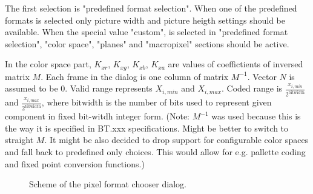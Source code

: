 The first selection is "predefined format selection". When one of the predefined formats is selected only picture width and picture heigth settings should be available. When the special value "custom", is selected in "predefined format selection", "color space", "planes" and "macropixel" sections should be active.

In the color space part, $K_{xr}$, $K_{xg}$, $K_{xb}$, $K_{xa}$ are values of coeffictients of inversed matrix $M$. Each frame in the dialog is one column of matrix $M^{-1}$. Vector $N$ is assumed to be 0. Valid range represents $X_{i, min}$ and $X_{i, max}$. Coded range is $\frac{x_{i, min}}{2 ^ \mathrm{bitwidth}}$ and $\frac{x_{i, max}}{2 ^ \mathrm{bitwidth}}$, where $\mathrm{bitwidth}$ is the number of bits used to represent given component in fixed bit-witdh integer form. (Note: $M^{-1}$ was used because this is the way it is specified in BT.xxx specifications. Might be better to switch to straight $M$. It might be also decided to drop support for configurable color spaces and fall back to predefined only choices. This would allow for e.g. pallette coding and fixed point conversion functions.)

\begin{figure}[ht]
  \begin{center}
    \def\svgwidth{400pt}
    
    \caption{Scheme of the pixel format chooser dialog.\label{fig:format_chooser_dialog}}
  \end{center}
\end{figure}

